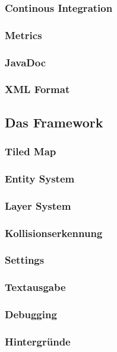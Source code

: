 		\subsubsection{Continous Integration}
		\subsubsection{Metrics}
		\subsubsection{JavaDoc}
		\subsubsection{XML Format}
	\subsection{Das Framework}
		\subsubsection{Tiled Map}
		\subsubsection{Entity System}
		\subsubsection{Layer System}
		\subsubsection{Kollisionserkennung}
		\subsubsection{Settings}
		\subsubsection{Textausgabe}
		\subsubsection{Debugging}
		\subsubsection{Hintergründe}
